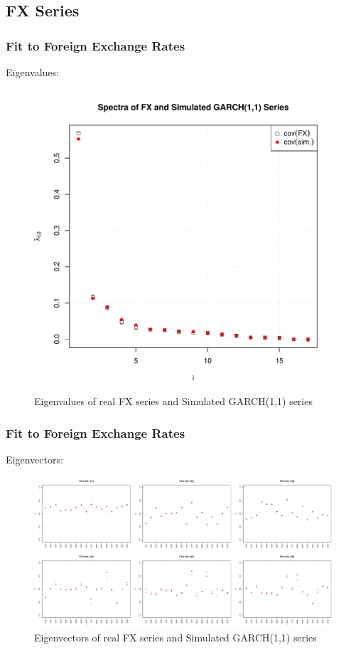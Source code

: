 \documentclass{beamer}
\begin{document}
\subsection{FX Series}
\begin{frame}
  \frametitle{Fit to Foreign Exchange Rates}
  Eigenvalues:
  \begin{figure}[htb!]
    \centering
    \includegraphics[scale=0.35]{FX_eigenvalues.pdf}
    \caption{\scriptsize Eigenvalues of real FX series and Simulated GARCH(1,1) series}
  \end{figure}
\end{frame}

\begin{frame}
  \frametitle{Fit to Foreign Exchange Rates}
  Eigenvectors:
  \begin{figure}[htb!]
    \centering
    \includegraphics[scale=0.2]{FX_eigenvectors.pdf}
    \caption{\scriptsize Eigenvectors of real FX series and Simulated GARCH(1,1) series}
  \end{figure}
\end{frame}
\end{document}
